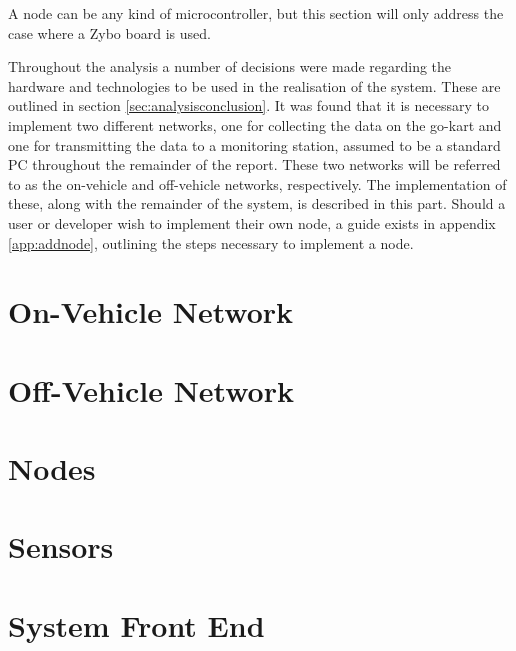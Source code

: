 
A node can be any kind of microcontroller, but this section will only address the case where a Zybo board is used. 

Throughout the analysis a number of decisions were made regarding the hardware and technologies to be used in the realisation of the system.
These are outlined in section \ref{sec:analysisconclusion}.
It was found that it is necessary to implement two different networks, one for collecting the data on the go-kart and one for transmitting the data to a monitoring station, assumed to be a standard PC throughout the remainder of the report.
These two networks will be referred to as the on-vehicle and off-vehicle networks, respectively.
The implementation of these, along with the remainder of the system, is described in this part.
Should a user or developer wish to implement their own node, a guide exists in appendix \ref{app:addnode}, outlining the steps necessary to implement a node.
\section{On-Vehicle Network}






\section{Off-Vehicle Network}
\label{sec:wifi}

\section{Nodes}

\section{Sensors}

\section{System Front End}
